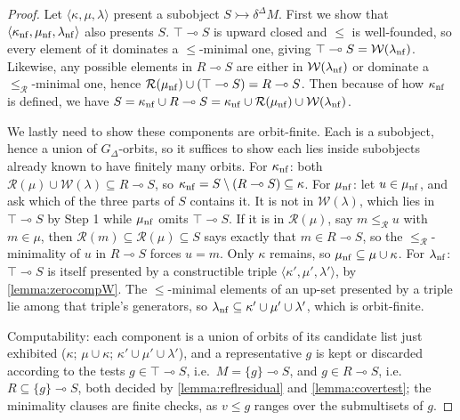 \documentclass{article}
\theoremstyle{definition}
\newcommand{\cR}{\mathcal{R}}
\newcommand{\cW}{\mathcal{W}}
\begin{document}
\begin{proof}
    Let $\langle \kappa, \mu, \lambda\rangle$ present a subobject  $S\rightarrowtail \delta^\Delta M$. 
    First we show that $\langle\kappa_{\rm nf},\mu_{\rm nf},\lambda_{\rm nf}\rangle$ also presents $S$. $\top\multimap S$ is upward closed and $\leq$ is well-founded, so every element of it dominates a $\leq$-minimal one, giving $\top\multimap S=\cW(\lambda_{\rm nf})$. Likewise, any possible elements in $R\multimap S$ are either in $\cW(\lambda_{\rm nf})$ or dominate a $\leq_\cR$-minimal one, hence $\cR(\mu_{\rm nf}) \cup (\top \multimap S) = R\multimap S$. Then because of how $\kappa_{\rm nf}$ is defined, we have $S= \kappa_{\rm nf}\cup R\multimap S = \kappa_{\rm nf} \cup \cR(\mu_{\rm nf})\cup \cW(\lambda_{\rm nf})$.

    We lastly need to show these components are orbit-finite. Each is a subobject, hence a union of $G_\Delta$-orbits, so it suffices to show each lies inside subobjects already known to have finitely many orbits.
    For $\kappa_{\rm nf}$:  both $\cR(\mu)\cup \cW(\lambda)\subseteq R\multimap S$, so $\kappa_{\rm nf} = S\setminus (R\multimap S) \subseteq \kappa$.
    For $\mu_{\rm nf}$: let $u\in\mu_{\rm nf}$, and ask which of the three parts of $S$ contains it.
    It is not in $\cW(\lambda)$, which lies in $\top\multimap S$ by Step 1 while $\mu_{\rm nf}$ omits $\top\multimap S$.
    If it is in $\cR(\mu)$, say $m\leq_\cR u$ with $m\in\mu$, then $\cR(m)\subseteq\cR(\mu)\subseteq S$ says exactly that $m\in R\multimap S$, so the $\leq_\cR$-minimality of $u$ in $R\multimap S$ forces $u=m$. 
    Only $\kappa$ remains, so $\mu_{\rm nf}\subseteq\mu\cup\kappa$.
    For $\lambda_{\rm nf}$:  $\top\multimap S$ is itself presented by a constructible triple $\langle\kappa',\mu',\lambda'\rangle$, by \cref{lemma:zerocompW}. The $\leq$-minimal elements of an up-set presented by a triple lie among that triple's generators, so $\lambda_{\rm nf}\subseteq\kappa'\cup\mu'\cup\lambda'$, which is orbit-finite.

    Computability: each component is a union of orbits of its candidate list just exhibited ($\kappa$; $\mu\cup\kappa$; $\kappa'\cup\mu'\cup\lambda'$), and a representative $g$ is kept or discarded according to the tests $g\in\top\multimap S$, i.e.\ $M=\{g\}\multimap S$, and $g\in R\multimap S$, i.e.\ $R\subseteq\{g\}\multimap S$, both decided by \cref{lemma:reflresidual} and \cref{lemma:covertest}; the minimality clauses are finite checks, as $v\leq g$ ranges over the submultisets of $g$.
\end{proof}
\end{document}
